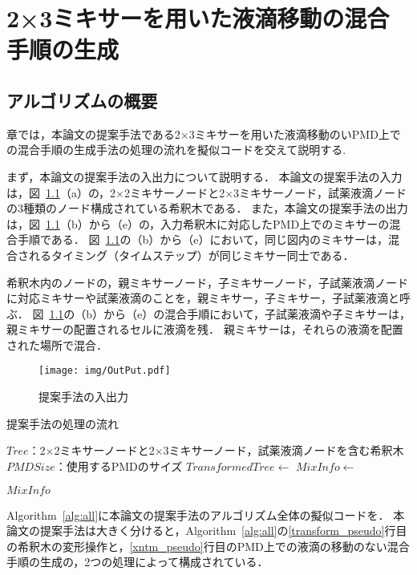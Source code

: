 \chapter{{2×3ミキサーを用いた液滴移動の混合手順の生成}}
\label{proposed}
\section{アルゴリズムの概要}
章では，本論文の提案手法である2$\times$3ミキサーを用いた液滴移動のいPMD上での混合手順の生成手法の処理の流れを擬似コードを交えて説明する.


まず，本論文の提案手法の入出力について説明する．
本論文の提案手法の入力は，図~\ref{fig:inputoutput}（a）の，2$\times$2ミキサーノードと2$\times$3ミキサーノード，試薬液滴ノードの3種類のノード構成されている希釈木である．
また，本論文の提案手法の出力は，図~\ref{fig:inputoutput}（b）から（e）の，入力希釈木に対応したPMD上でのミキサーの混合手順である．
図~\ref{fig:inputoutput}の（b）から（e）において，同じ図内のミキサーは，混合されるタイミング（タイムステップ）が同じミキサー同士である．

希釈木内のノードの，親ミキサーノード，子ミキサーノード，子試薬液滴ノードに対応ミキサーや試薬液滴のことを，親ミキサー，子ミキサー，子試薬液滴と呼ぶ．
図~\ref{fig:inputoutput}の（b）から（e）の混合手順において，子試薬液滴や子ミキサーは，親ミキサーの配置されるセルに液滴を残．
親ミキサーは，それらの液滴を配置された場所で混合．

\begin{figure}[tbp]
 \centering 
    \texttt{[image: img/OutPut.pdf]}
 \caption{提案手法の入出力}\label{fig:inputoutput}
\end{figure}

\begin{algorithm}[tbp]
 \caption{提案手法の処理の流れ}\label{alg:all}
 \begin{algorithmic}[1]
     \Require $\mathit{Tree}$：2$\times$2ミキサーノードと2$\times$3ミキサーノード，試薬液滴ノードを含む希釈木 
     \Require $\mathit{PMDSize}$：使用するPMDのサイズ
     \State $\mathit{TransformedTree} \gets$  \label{transform_pseudo}
     \State $\mathit{MixInfo \gets}$  \label{xntm_pseudo}

      \Return $\mathit{MixInfo}$
 \end{algorithmic}
\end{algorithm}
Algorithm~\ref{alg:all}に本論文の提案手法のアルゴリズム全体の擬似コードを．
本論文の提案手法は大きく分けると，Algorithm~\ref{alg:all}の\ref{transform_pseudo}行目の希釈木の変形操作と，\ref{xntm_pseudo}行目のPMD上での液滴の移動のない混合手順の生成の，2つの処理によって構成されている．

